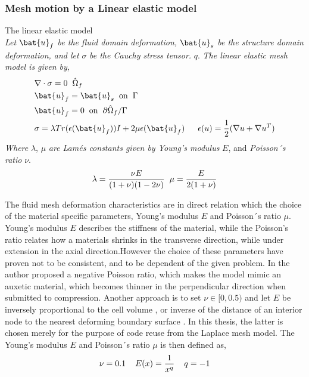 \subsubsection*{Mesh motion by a Linear elastic model}
\begin{equat}
The linear elastic model \\ \textit{Let} $\bat{u}_f$ \textit{be the fluid domain deformation,} $\bat{u}_s$ \textit{be the structure domain deformation, and let} $\sigma$ \textit{be the Cauchy stress tensor.} $q$. \textit{The linear elastic mesh model is given by, }   
\begin{align*}
&\nabla \cdot \sigma = 0 \hspace{2mm} \hat{\Omega}_f\\
&\bat{u}_f = \bat{u}_s \hspace{2mm} \text{on} \hspace{2mm}  \Gamma \\
&\bat{u}_f = 0 \hspace{2mm} \text{on} \hspace{2mm} \partial \hat{\Omega}_f / \Gamma \\
&\sigma = \lambda Tr(\epsilon(\bat{u}_f)) I + 2 \mu \epsilon(\bat{u}_f) \hspace{2mm}
&\epsilon(u) = \frac{1}{2}(\nabla u + \nabla  u^T)
\end{align*}
\textit{Where} $\lambda$, $\mu$ \textit{are Lamés constants given by Young's modulus}  $E$, and \textit{Poisson´s ratio } $\nu$.
\begin{align*}
\lambda = \frac{\nu E}{(1 + \nu)(1 - 2\nu)} \hspace{2mm} \mu = \frac{E}{2(1 + \nu)}
\end{align*}
\end{equat}

The fluid mesh deformation characteristics are in direct relation which the choice of the material specific parameters, Young's modulus $E$ and Poisson´s ratio $\mu$.  Young's modulus $E$ describes the stiffness of the material, while the Poisson's ratio relates how a materials shrinks in the transverse direction, while under extension in the axial direction.However the choice of these parameters have proven not to be consistent, and to be dependent of the given problem.
In \cite{Wicka} the author proposed a negative Poisson ratio, which makes the model mimic an auxetic material, which becomes thinner in the perpendicular direction when submitted to compression. Another approach is to set  $\nu \in [0, 0.5)$ and let $E$ be inversely proportional to the cell volume \cite{Biedron}, or inverse of the distance of an interior node to the nearest deforming boundary surface \cite{MM2016}. In this thesis, the latter is chosen merely for the purpose of code reuse from the Laplace mesh model. The Young's modulus $E$ and Poisson´s ratio $\mu$ is then  defined as,
\begin{align*}
\nu = 0.1 \hspace{4mm} E(x) = \frac{1}{x^q}  \hspace{4mm} q = -1
\end{align*}

